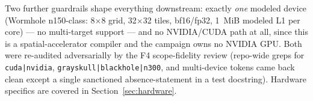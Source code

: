 Two further guardrails shape everything downstream: exactly \emph{one} modeled
device (Wormhole n150-class: 8$\times$8 grid, 32$\times$32 tiles, bf16/fp32,
1~MiB modeled L1 per core) --- no multi-target support --- and no NVIDIA/CUDA path
at all, since this is a spatial-accelerator compiler and the campaign owns no
NVIDIA GPU. Both were re-audited adversarially by the F4 scope-fidelity review
(repo-wide greps for \texttt{cuda|nvidia}, \texttt{grayskull|blackhole|n300}, and
multi-device tokens came back clean except a single sanctioned
absence-statement in a test docstring). Hardware specifics are covered in
Section~\ref{sec:hardware}.
